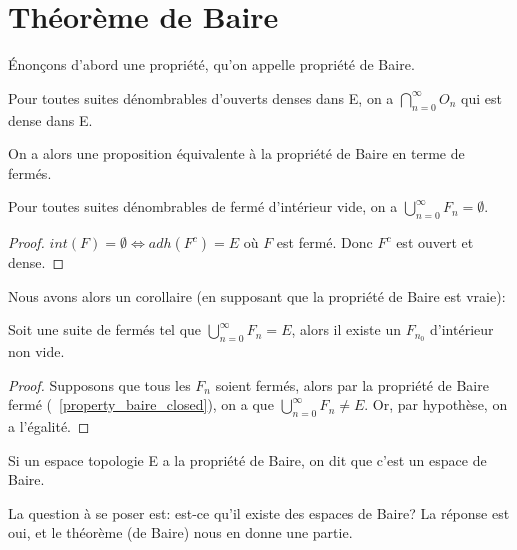 \chapter{Théorème de Baire}
\label{chapter_baire_theorem}

Énonçons d'abord une propriété, qu'on appelle propriété de Baire.

\begin{propriete} 
\label{property_baire_open}
	Pour toutes suites dénombrables d'ouverts denses dans E, on a $\displaystyle
	\bigcap_{n = 0}^{\infty} O_{n}$ qui est dense dans E.
\end{propriete}

On a alors une proposition équivalente à la propriété de Baire en terme de
fermés.

\begin{propriete} 
\label{property_baire_closed}
	Pour toutes suites dénombrables de fermé d'intérieur vide, on a
	$\displaystyle \bigcup_{n = 0}^{\infty} F_{n} = \emptyset$.
\end{propriete}

\begin{proof}
	$int(F) = \emptyset \Leftrightarrow adh(F^{c}) = E$ où $F$ est fermé. Donc
	$F^{c}$ est ouvert et dense.
\end{proof}

Nous avons alors un corollaire (en supposant que la propriété de Baire est
vraie):

\begin{corollary}
\label{corollary_baire_int_non_empty}
	Soit une suite  de fermés tel que $\displaystyle
	\bigcup_{n = 0}^{\infty}{F_{n}} = E$, alors il existe un $F_{n_{0}}$
	d'intérieur non vide.
\end{corollary}

\begin{proof}
	Supposons que tous les $F_{n}$ soient fermés, alors par la
	propriété de Baire fermé (~\ref{property_baire_closed}), on a que
	$\displaystyle \bigcup_{n = 0}^{\infty}{F_{n}} \neq E$. Or, par hypothèse,
	on a l'égalité.
\end{proof}

\begin{definition} 
\label{definition_baire_space}
	Si un espace topologie E a la propriété de Baire, on dit que c'est un espace
	de Baire.
\end{definition}

La question à se poser est: est-ce qu'il existe des espaces de Baire? La
réponse est oui, et le théorème (de Baire) nous en donne une partie.

